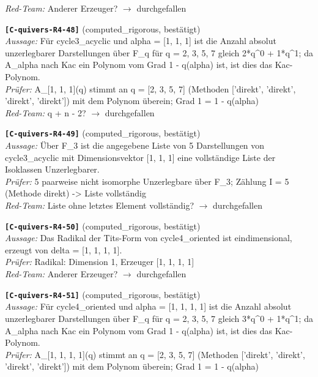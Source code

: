 \documentclass[11pt]{article}
\theoremstyle{definition}\newtheorem{definition}[theorem]{Definition}\newtheorem{remark}[theorem]{Remark}\newtheorem{observation}[theorem]{Numerical observation}
\begin{document}
\textit{Red-Team:} Anderer Erzeuger? $\to$ durchgefallen\par\medskip
\noindent\textbf{\texttt{[C-quivers-R4-48]}} (computed\_rigorous, bestätigt)\\
\textit{Aussage:} Für cycle3\_acyclic und alpha = [1, 1, 1] ist die Anzahl absolut unzerlegbarer Darstellungen über F\_q für q = 2, 3, 5, 7 gleich 2*q\textasciicircum{}0 + 1*q\textasciicircum{}1; da A\_alpha nach Kac ein Polynom vom Grad 1 - q(alpha) ist, ist dies das Kac-Polynom.\\
\textit{Prüfer:} A\_[1, 1, 1](q) stimmt an q = [2, 3, 5, 7] (Methoden ['direkt', 'direkt', 'direkt', 'direkt']) mit dem Polynom überein; Grad 1 = 1 - q(alpha)\\
\textit{Red-Team:} q + n - 2? $\to$ durchgefallen\par\medskip
\noindent\textbf{\texttt{[C-quivers-R4-49]}} (computed\_rigorous, bestätigt)\\
\textit{Aussage:} Über F\_3 ist die angegebene Liste von 5 Darstellungen von cycle3\_acyclic mit Dimensionsvektor [1, 1, 1] eine vollständige Liste der Isoklassen Unzerlegbarer.\\
\textit{Prüfer:} 5 paarweise nicht isomorphe Unzerlegbare über F\_3; Zählung I = 5 (Methode direkt) -> Liste vollständig\\
\textit{Red-Team:} Liste ohne letztes Element vollständig? $\to$ durchgefallen\par\medskip
\noindent\textbf{\texttt{[C-quivers-R4-50]}} (computed\_rigorous, bestätigt)\\
\textit{Aussage:} Das Radikal der Tits-Form von cycle4\_oriented ist eindimensional, erzeugt von delta = [1, 1, 1, 1].\\
\textit{Prüfer:} Radikal: Dimension 1, Erzeuger [1, 1, 1, 1]\\
\textit{Red-Team:} Anderer Erzeuger? $\to$ durchgefallen\par\medskip
\noindent\textbf{\texttt{[C-quivers-R4-51]}} (computed\_rigorous, bestätigt)\\
\textit{Aussage:} Für cycle4\_oriented und alpha = [1, 1, 1, 1] ist die Anzahl absolut unzerlegbarer Darstellungen über F\_q für q = 2, 3, 5, 7 gleich 3*q\textasciicircum{}0 + 1*q\textasciicircum{}1; da A\_alpha nach Kac ein Polynom vom Grad 1 - q(alpha) ist, ist dies das Kac-Polynom.\\
\textit{Prüfer:} A\_[1, 1, 1, 1](q) stimmt an q = [2, 3, 5, 7] (Methoden ['direkt', 'direkt', 'direkt', 'direkt']) mit dem Polynom überein; Grad 1 = 1 - q(alpha)\\
\end{document}
